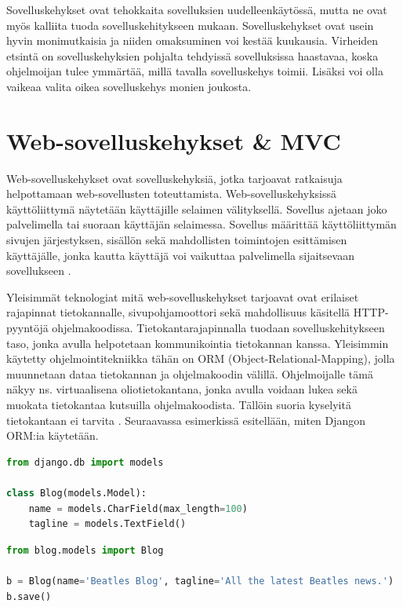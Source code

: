 \documentclass[utf8]{gradu3}
\begin{document}
Sovelluskehykset ovat tehokkaita sovelluksien uudelleenkäytössä, mutta ne ovat myös kalliita tuoda sovelluskehitykseen mukaan. Sovelluskehykset ovat usein hyvin monimutkaisia ja niiden omaksuminen voi kestää kuukausia. Virheiden etsintä on sovelluskehyksien pohjalta tehdyissä sovelluksissa haastavaa, koska ohjelmoijan tulee ymmärtää, millä tavalla sovelluskehys toimii. Lisäksi voi olla vaikeaa valita oikea sovelluskehys monien joukosta. 

\chapter{Web-sovelluskehykset \& MVC}
Web-sovelluskehykset ovat sovelluskehyksiä, jotka tarjoavat ratkaisuja helpottamaan web-sovellusten toteuttamista. Web-sovelluskehyksissä käyttöliittymä näytetään käyttäjille selaimen välityksellä. Sovellus ajetaan joko palvelimella tai suoraan käyttäjän selaimessa. Sovellus määrittää käyttöliittymän sivujen järjestyksen, sisällön sekä mahdollisten toimintojen esittämisen käyttäjälle, jonka kautta käyttäjä voi vaikuttaa palvelimella sijaitsevaan sovellukseen \parencite{vosloo}. 

Yleisimmät teknologiat mitä web-sovelluskehykset tarjoavat ovat erilaiset rajapinnat tietokannalle, sivupohjamoottori sekä mahdollisuus käsitellä HTTP-pyyntöjä ohjelmakoodissa. Tietokantarajapinnalla tuodaan sovelluskehitykseen taso, jonka avulla helpotetaan kommunikointia tietokannan kanssa. Yleisimmin käytetty ohjelmointitekniikka tähän on ORM (Object-Relational-Mapping), jolla muunnetaan dataa tietokannan ja ohjelmakoodin välillä. Ohjelmoijalle tämä näkyy ns. virtuaalisena oliotietokantana, jonka avulla voidaan lukea sekä muokata tietokantaa kutsuilla ohjelmakoodista. Tällöin suoria kyselyitä tietokantaan ei tarvita \parencite{Ghandeharizadeh}. Seuraavassa esimerkissä esitellään, miten Djangon ORM:ia käytetään.


\begin{lstlisting}[language=Python]
from django.db import models

class Blog(models.Model):
    name = models.CharField(max_length=100)
    tagline = models.TextField()
\end{lstlisting}

\begin{lstlisting}[language=Python]
from blog.models import Blog

b = Blog(name='Beatles Blog', tagline='All the latest Beatles news.')
b.save()
\end{lstlisting}
\end{document}
